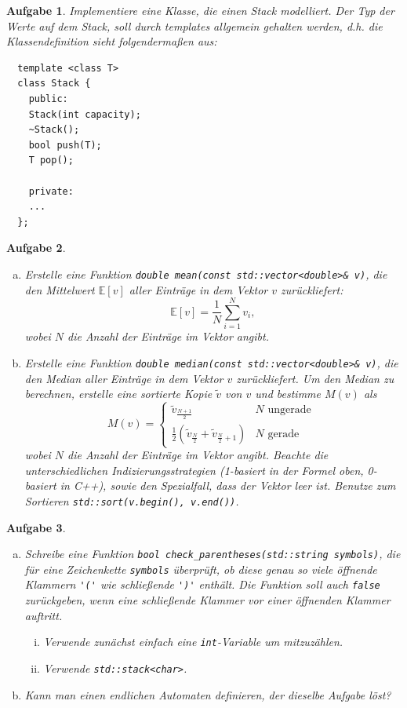 \documentclass[a4paper,12pt,parskip=full]{scrartcl}
\theoremstyle{exercise}
\newtheorem{exercise}{Aufgabe}
\begin{document}
\begin{exercise}
Implementiere eine Klasse, die einen Stack
modelliert. Der Typ der Werte auf dem Stack, soll durch templates
allgemein gehalten werden, d.h. die Klassendefinition sieht
folgendermaßen aus:
\begin{lstlisting}
  template <class T>
  class Stack {
    public:
    Stack(int capacity);
    ~Stack();
    bool push(T);
    T pop();

    private:
    ...
  };
\end{lstlisting}
\end{exercise}

\begin{exercise}
\begin{enumerate}[a)]
\item Erstelle eine Funktion \lstinline{double mean(const std::vector<double>& v)}, die den Mittelwert $\mathbb{E}[v]$ aller
  Einträge in dem Vektor $v$ zurückliefert:
  $$
  \mathbb{E}[v] = \frac{1}{N} \sum\limits_{i=1}^N{v_i},
  $$
  wobei $N$ die Anzahl der Einträge im Vektor angibt.
\item Erstelle eine Funktion \lstinline{double median(const std::vector<double>& v)}, die den Median aller Einträge in dem
  Vektor $v$ zurückliefert. Um den Median zu berechnen, erstelle eine
  sortierte Kopie $\tilde{v}$ von $v$ und bestimme $M(v)$ als
  $$
  M(v) =
  \begin{cases}
    \tilde{v}_{\frac{N+1}{2}} & N \text{ ungerade } \\
    \frac{1}{2} ( \tilde{v}_{\frac{N}{2}} + \tilde{v}_{\frac{N}{2}+1}
    ) & N \text{ gerade }
  \end{cases}
  $$
  wobei $N$ die Anzahl der Einträge im Vektor angibt. Beachte die
  unterschiedlichen Indizierungsstrategien (1-basiert in der Formel
  oben, 0-basiert in C++), sowie den Spezialfall, dass der Vektor leer
  ist. Benutze zum Sortieren \lstinline{std::sort(v.begin(), v.end())}.
\end{enumerate}
\end{exercise}

\begin{exercise}
\begin{enumerate}[a)]
\item Schreibe eine Funktion \lstinline{bool check_parentheses(std::string symbols)}, die für eine Zeichenkette
  \lstinline{symbols} überprüft, ob diese genau so viele öffnende
  Klammern \lstinline{'('} wie schließende \lstinline{')'}
  enthält. Die Funktion soll auch \lstinline{false} zurückgeben, wenn
  eine schließende Klammer vor einer öffnenden Klammer auftritt.
  \begin{enumerate}[i)]
  \item Verwende zunächst einfach eine \lstinline{int}-Variable um
    mitzuzählen.
  \item Verwende \lstinline{std::stack<char>}.
  \end{enumerate}
\item Kann man einen endlichen Automaten definieren, der dieselbe
  Aufgabe löst?
\end{enumerate}
\end{exercise}
\end{document}
